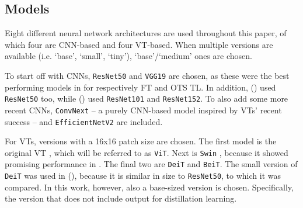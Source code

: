 
\subsection{Models} \label{methods:models}
Eight different neural network architectures are used throughout this paper, of which four are CNN-based and four VT-based. When multiple versions are available (i.e. `base', `small', `tiny'), `base'/`medium' ones are chosen.

To start off with CNNs, \texttt{ResNet50} \citep{he2016deep} and \texttt{VGG19} \citep{simonyan2014very} are chosen, as these were the best performing models in \citeauthor{sabatelli2018deep} for respectively FT and OTS TL. In addition, \citeauthor{matsoukas2021time} (\citeyear{matsoukas2021time}) used \texttt{ResNet50} too, while \citeauthor{zhou2021convnets} (\citeyear{zhou2021convnets}) used \texttt{ResNet101} and \texttt{ResNet152}. To also add some more recent CNNs, \texttt{ConvNext} \citep{liu2022convnet} -- a purely CNN-based model inspired by VTs' recent success -- and \texttt{EfficientNetV2} \citep{tan2021efficientnetv2} are included.

For VTs, versions with a 16x16 patch size are chosen. The first model is the original VT \citep{dosovitskiy2020image}, which will be referred to as \texttt{ViT}. Next is \texttt{Swin} \citep{liu2021swin}, because it showed promising performance in \citeauthor{zhou2021convnets}. The final two are \texttt{DeiT} and \texttt{BeiT}. The small version of \texttt{DeiT} was used in \citeauthor{matsoukas2021time} (\citeyear{matsoukas2021time}), because it is similar in size to \texttt{ResNet50}, to which it was compared. In this work, however, also a base-sized version is chosen. Specifically, the version that does not include output for distillation learning.



